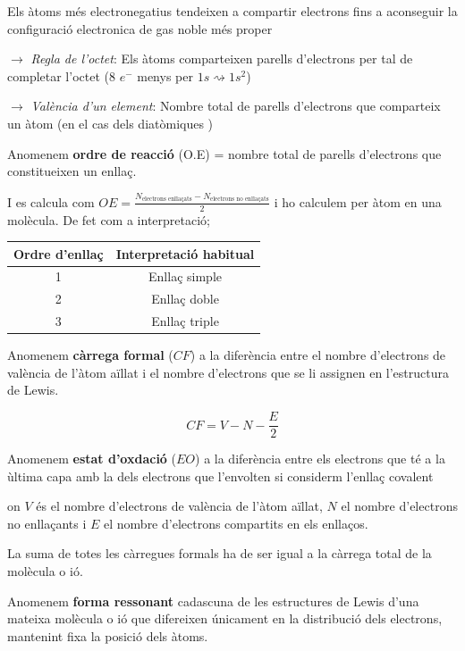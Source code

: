 \documentclass[12pt]{article}
\begin{document}
Els àtoms més electronegatius tendeixen a compartir electrons fins a aconseguir la configuració electronica de gas noble més proper

$\rightarrow$ \textit{Regla de l'octet}: Els àtoms comparteixen parells d'electrons per tal de completar l'octet (8 $e^-$ menys per $1s \rightsquigarrow 1s^2$)

$\rightarrow$ \textit{València d'un element}: Nombre total de parells d'electrons que comparteix un àtom (en el cas dels diatòmiques )

Anomenem \textbf{ordre de reacció} (O.E) = nombre total de parells d’electrons que constitueixen un enllaç.

I es calcula com $OE = \frac{N_{\text{electrons enllaçats}}-N_{\text{electrons no enllaçats}}}{2}$ i ho calculem per àtom en una molècula. De fet com a interpretació;

\begin{table}[h]
    \centering
    \begin{tabular}{c|c}
        \hline
        \textbf{Ordre d'enllaç} & \textbf{Interpretació habitual} \\
        \hline
        1 & Enllaç simple \\
        2 & Enllaç doble \\
        3 & Enllaç triple \\
        \hline
    \end{tabular}
\end{table}

Anomenem \textbf{càrrega formal} (\(CF\)) a la diferència entre el nombre d'electrons de valència de l'àtom aïllat i el nombre d'electrons que se li assignen en l'estructura de Lewis.

\[
\boxed{CF=V-N-\frac{E}{2}}
\]

Anomenem \textbf{estat d'oxdació} (\(EO\)) a la diferència entre els electrons que té a la ùltima capa amb la dels electrons que l'envolten si considerm l'enllaç covalent

on \(V\) és el nombre d'electrons de valència de l'àtom aïllat, \(N\) el nombre d'electrons no enllaçants i \(E\) el nombre d'electrons compartits en els enllaços.

La suma de totes les càrregues formals ha de ser igual a la càrrega total de la molècula o ió.

Anomenem \textbf{forma ressonant} cadascuna de les estructures de Lewis d'una mateixa molècula o ió que difereixen únicament en la distribució dels electrons, mantenint fixa la posició dels àtoms.
\end{document}
